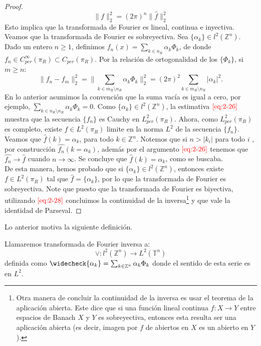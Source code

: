 \begin{proof}
\begin{equation}
        \|f\|_{2}^{2}=(2\pi)^{n}\|\hat{f}\|_{2}^{2}\label{eq:2-28}
      \end{equation}
      Esto implica que la transformada de Fourier es lineal, continua e inyectiva.\\
      Veamos que la transformada de Fourier es sobreyectiva. Sea $\{\alpha_k\}\in l^2(\mathbb{Z}^{n})$. Dado un entero $n\geq 1$, definimos $f_n(x)=\sum_{k\in n_R}\alpha_k\Phi_k$, de donde $f_n \in C^{\infty}_{per}(\pi_R) \subset C_{per}(\pi_R)$. Por la relación de ortogonalidad de los $\{\Phi_k\}$, si $m\geq n$:
      \begin{equation}
        \|f_n-f_m\|_{2}^{2}=\|\sum_{k\in m_R\setminus n_R}\alpha_k\Phi_k\|_{2}^{2}=(2\pi)^{2}\sum_{k\in m_R\setminus n_R}|\alpha_k|^2.\label{eq:2-29}
      \end{equation}
      En lo anterior asumimos la convención que la suma vacía es igual a cero, por ejemplo, $\sum_{k\in n_R\setminus n_R}\alpha_k\Phi_k=0$. Como $\{\alpha_k\}\in l^2(\mathbb{Z}^{n})$, la estimativa $\textcolor{red}{\ref{eq:2-26}}$ muestra que la secuencia $\{f_n\}$ es Cauchy en $L^2_{per}(\pi_R)$. Ahora, como $L^2_{per}(\pi_R)$ es completo, existe $f \in L^2(\pi_R)$ limite en la norma $L^{2}$ de la secuencia $\{f_n\}$. Veamos que $\hat{f}(k) = \alpha_k$, para todo $k \in \mathbb{Z}^{n}$. Notemos que si $n > |k_i|$ para todo $i$ , por construcción $\hat{f_n}(k=\alpha_k)$, además por el argumento $\textcolor{red}{\ref{eq:2-26}}$ tenemos que $\hat{f_n}\to\hat{f}$ cuando $n\to\infty$. Se concluye que $\hat{f}(k)=\alpha_k$, como se buscaba.\\
      De esta manera, hemos probado que si $\{\alpha_k\} \in l^2(\mathbb{Z}^{n})$, entonces existe $f \in L^2(\pi_R)$ tal que $\hat{f}=\{\alpha_k\}$, por lo que la transformada de Fourier es sobreyectiva. Note que puesto que la transformada de Fourier es biyectiva, utilizando $\textcolor{red}{\ref{eq:2-28}}$ concluimos la continuidad de la inversa\footnote{Otra manera de concluir la continuidad de la inversa es usar el teorema de la aplicación abierta. Este dice que si una función lineal continua $f : X \to Y$ entre espacios de Banach $X$ y $Y$ es sobreyectiva, entonces esta resulta ser una aplicación abierta (es decir, imagen por $f$ de abiertos en $X$ es un abierto en $Y$).} y que vale la identidad de Parseval.
    \end{proof}
    Lo anterior motiva la siguiente definición.
    \begin{definition}
      Llamaremos transformada de Fourier inversa a:
      \begin{equation}
        \vee:l^2(\mathbb{Z}^{n})\to L^2(\mathbb{T}^{n})\label{definition:transformada-inversa-de-fourier} 
      \end{equation}
      definida como $\widecheck{\alpha_k}=\sum_{k\in\mathbb{Z}^{n}}\alpha_k\Phi_{k}$ donde el sentido de esta serie es en $L^2$. 
    \end{definition}
